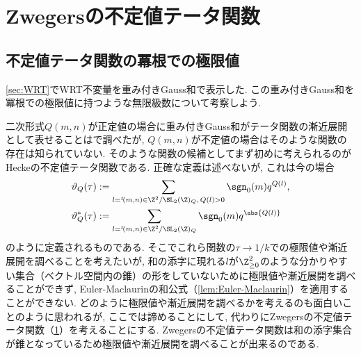 \documentclass[11pt,b5paper,oneside,lualatex]{ltjsarticle} %
\numberwithin{equation}{section} %
\begin{document}

\section{Zwegersの不定値テータ関数} \label{sec:Zwegers_theta}



\subsection{不定値テータ関数の冪根での極限値} \label{subsec:indef_theta_limit}


\cref{sec:WRT}でWRT不変量を重み付きGauss和で表示した.
この重み付きGauss和を冪根での極限値に持つような無限級数について考察しよう. 

二次形式$ Q(m, n) $が正定値の場合に重み付きGauss和がテータ関数の漸近展開として表せることは\cite{MM}で調べたが, $ Q(m, n) $が不定値の場合はそのような関数の存在は知られていない. 
そのような関数の候補としてまず初めに考えられるのがHeckeの不定値テータ関数である. 
正確な定義は述べないが, これは今の場合
\begin{align}
	\vartheta_Q (\tau) 
	&:=
	\sum_{l = {}^t\!(m, n) \in \Z^2 / \SL_2(\Z)_Q, \, Q(l) > 0} \sgn_0(m) q^{Q(l)}, 
	\\
	\vartheta_Q^* (\tau)
	&:=
	\sum_{l = {}^t\!(m, n) \in \Z^2 / \SL_2(\Z)_Q} \sgn_0(m) q^{\abs{Q(l)}}
\end{align}
のように定義されるものである. 
そこでこれら関数の$ \tau \to 1/k $での極限値や漸近展開を調べることを考えたいが, 和の添字に現れる$ l $が$ \Z_{\ge 0}^2 $のような分かりやすい集合（ベクトル空間内の錐）の形をしていないために極限値や漸近展開を調べることができず, Euler-Maclaurinの和公式（\cref{lem:Euler-Maclaurin}）を適用することができない.
どのように極限値や漸近展開を調べるかを考えるのも面白いことのように思われるが, ここでは諦めることにして, 代わりにZwegersの不定値テータ関数（\cref{sec:Zwegers_theta}）を考えることにする. 
Zwegersの不定値テータ関数は和の添字集合が錐となっているため極限値や漸近展開を調べることが出来るのである. 

\end{document}
